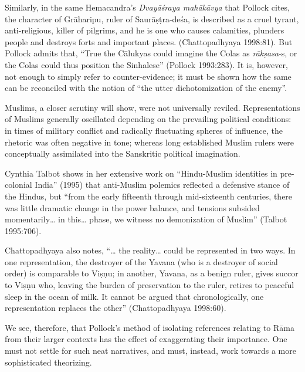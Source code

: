Similarly, in the same Hemacandra’s {\sl Dvayāśraya mahākāvya} that Pollock cites, the character of Grāharipu, ruler of Saurāṣṭra-deśa, is described as a cruel tyrant, anti-religious, killer of pilgrims, and he is one who causes calamities, plunders people and destroys forts and important places. (Chattopadhyaya 1998:81). But Pollock admits that, “True the Cālukyas could imagine the Colas as {\sl rākṣasa}-s, or the Colas could thus position the Sinhalese” (Pollock 1993:283). It is, however, not enough to simply refer to counter-evidence; it must be shown how the same can be reconciled with the notion of “the utter dichotomization of the enemy”. 

Muslims, a closer scrutiny will show, were not universally reviled. Representations of Muslims generally oscillated depending on the prevailing political conditions: in times of military conflict and radically fluctuating spheres of influence, the rhetoric was often negative in tone; whereas long established Muslim rulers were conceptually assimilated into the Sanskritic political imagination. 

Cynthia Talbot shows in her extensive work on “Hindu-Muslim identities in pre-colonial India” (1995) that anti-Muslim polemics reflected a defensive stance of the Hindus, but “from the early fifteenth through mid-sixteenth centuries, there was little dramatic change in the power balance, and tensions subsided momentarily… in this… phase, we witness no demonization of Muslim” (Talbot 1995:706). 

\newpage

Chattopadhyaya also notes, “… the reality… could be represented in two ways. In one representation, the destroyer of the Yavana (who is a destroyer of social order) is comparable to Viṣṇu; in another, Yavana, as a benign ruler, gives succor to Viṣṇu who, leaving the burden of preservation to the ruler, retires to peaceful sleep in the ocean of milk. It cannot be argued that chronologically, one representation replaces the other” (Chattopadhyaya 1998:60). 

We see, therefore, that Pollock’s method of isolating references relating to Rāma from their larger contexts has the effect of exaggerating their importance. One must not settle for such neat narratives, and must, instead, work towards a more sophisticated theorizing. 

